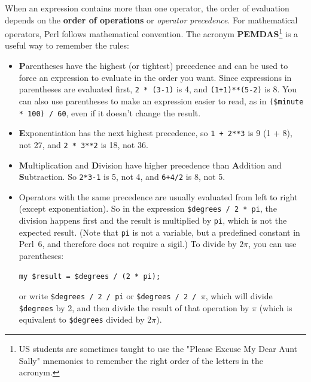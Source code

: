 When an expression contains more than one operator, the order of
evaluation depends on the {\bf order of operations} or \emph{operator precedence}. 
For mathematical operators, Perl follows mathematical convention.
The acronym {\bf PEMDAS}\footnote{US students are sometimes taught 
to use the "Please Excuse My Dear Aunt Sally" mnemonics to remember 
the right order of the letters in the acronym.} is a useful 
way to remember the rules:

\begin{itemize}

\item {\bf P}arentheses have the highest (or tightest) precedence and can be used 
to force an expression to evaluate in the order you want. Since
expressions in parentheses are evaluated first, {\tt 2 * (3-1)} is 4,
and {\tt (1+1)**(5-2)} is 8. You can also use parentheses to make an
expression easier to read, as in {\tt (\$minute * 100) / 60}, even
if it doesn't change the result.

\item {\bf E}xponentiation has the next highest precedence, so
{\tt 1 + 2**3} is 9 (1 + 8), not 27, and {\tt 2 * 3**2} is 18, not 36.

\item {\bf M}ultiplication and {\bf D}ivision have higher precedence
  than {\bf A}ddition and {\bf S}ubtraction.  So {\tt 2*3-1} is 5, not
  4, and {\tt 6+4/2} is 8, not 5.

\item Operators with the same precedence are usually evaluated 
from left to right (except exponentiation).  So in the expression 
{\tt \$degrees / 2 * pi}, the division happens first and the 
result is multiplied by {\tt pi}, which is not the expected 
result. (Note that {\tt pi} is not a variable, but a predefined 
constant in Perl~6, and therefore does not require a sigil.)  To 
divide by $2 \pi$, you can use parentheses:
  
\begin{verbatim}
my $result = $degrees / (2 * pi);  
\end{verbatim}  
 
or write
  {\tt \$degrees / 2 / pi} or {\tt \$degrees / 2 / $\pi$}, which
  will divide \verb'$degrees' by 2, and then divide the result of 
  that operation by $\pi$ (which is equivalent to \verb'$degrees'
  divided by $2 \pi$).

\end{itemize}


